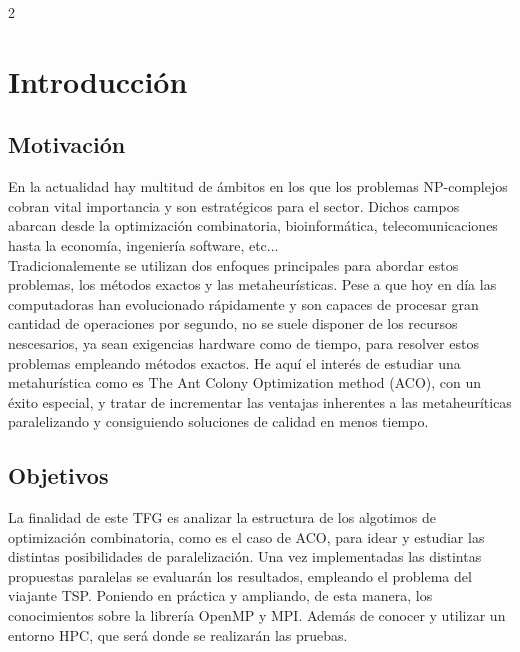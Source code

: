 2\chapter{Introducci\'on}\label{cap:intro}

\section{Motivaci\'on}
En la actualidad hay multitud de \'ambitos en los que los problemas NP-complejos cobran vital importancia y son estrat\'egicos para el sector. Dichos campos abarcan desde la optimizaci\'on combinatoria, bioinform\'atica, telecomunicaciones hasta la econom\'ia, ingenier\'ia software, etc...\\
Tradicionalemente se utilizan dos enfoques principales para abordar estos problemas, los m\'etodos exactos y las metaheur\'isticas. Pese a que hoy en d\'ia las computadoras han evolucionado r\'apidamente y son capaces de procesar gran cantidad de operaciones por segundo, no se suele disponer de los recursos nescesarios, ya sean exigencias hardware como de tiempo, para resolver estos problemas empleando m\'etodos exactos. He aqu\'i el inter\'es de estudiar una metahur\'istica como es The Ant Colony Optimization method (ACO), con un \'exito especial, y tratar de incrementar las ventajas inherentes a las metaheur\'iticas paralelizando y consiguiendo soluciones de calidad en menos tiempo.

\cite{libro1}

\section{Objetivos}\label{cap:objetivos}
La finalidad de este TFG es analizar la estructura de los algotimos de optimizaci\'on combinatoria, como es el caso de ACO, para idear y estudiar las distintas posibilidades de paralelizaci\'on. Una vez implementadas las distintas propuestas paralelas se evaluar\'an los resultados, empleando el problema del viajante TSP. Poniendo en pr\'actica y ampliando, de esta manera, los conocimientos sobre la librer\'ia OpenMP y MPI. Adem\'as de conocer y utilizar un entorno HPC, que ser\'a donde se realizar\'an las pruebas.

